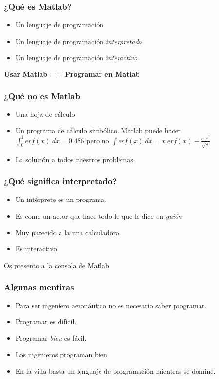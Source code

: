 \documentclass[12pt]{beamer}
\begin{document}
\begin{large}

\begin{frame}
  \frametitle{¿Qué es Matlab?}
  \begin{itemize}
    \item{Un lenguaje de programación}
    \item{Un lenguaje de programación \emph{interpretado}}
    \item{Un lenguaje de programación \emph{interactivo}}
  \end{itemize}
  \begin{center}
    \textbf{Usar Matlab == Programar en Matlab}
  \end{center}
\end{frame}

\begin{frame}
  \frametitle{¿Qué no es Matlab}
  \begin{itemize}
    \item Una hoja de cálculo
    \item Un programa de cálculo simbólico.  Matlab puede hacer
      $\int_0^1 erf(x)\ dx = 0.486$ pero no 
      $\int erf(x)\ dx = x\ erf(x)+\frac{e^{-x^2}}{\sqrt{\pi}}$
    \item La solución a todos nuestros problemas.
  \end{itemize}
\end{frame}


\testcode{
  \begin{lstlisting}
    >>
  \end{lstlisting}
}

\begin{frame}
  \frametitle{¿Qué significa interpretado?}
  \begin{itemize}
    \item Un intérprete es un programa.
    \item Es como un actor que hace todo lo que le dice un
      \emph{guión}
    \item Muy parecido a la una calculadora.
    \item Es interactivo.
  \end{itemize}
  \testcode
  Os presento a la consola de Matlab
\end{frame}

\begin{frame}
\frametitle{Algunas mentiras}
\begin{itemize}
  \item Para ser ingeniero aeronáutico no es necesario saber
    programar.
  \item Programar es difícil.
  \item Programar \emph{bien} es fácil.
  \item Los ingenieros programan bien
  \item En la vida basta un lenguaje de programación mientras se
    domine.
\end{itemize}
\end{frame}


\end{large}
\end{document}

